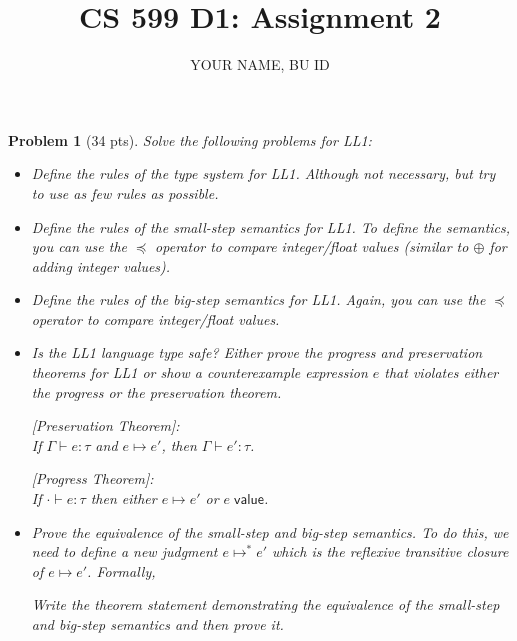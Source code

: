 \documentclass{article}
\title{CS 599 D1: Assignment 2}
\author{YOUR NAME, BU ID}
\date{}
\newcommand{\m}[1]{\mathsf{#1}}
\newcommand{\step}{\mapsto}
\newcommand{\val}[1]{#1 \; \m{value}}
\newcommand{\G}{\Gamma}
\newcommand{\mstep}{\step^{*}}
\newtheorem{problem}{Problem}
\begin{document}
\maketitle

\begin{problem}[34 pts]
Solve the following problems for LL1:

    \begin{itemize}
        \item[(4 pts)] Define the rules of the type system for LL1. Although not necessary, but try to use as
        few rules as possible.
        
        \item[(5 pts)] Define the rules of the small-step semantics for LL1. To define the semantics, you can use the $\preceq$
        operator to compare integer/float values (similar to $\oplus$ for adding integer values).

        \item[(5 pts)] Define the rules of the big-step semantics for LL1. Again, you can use the $\preceq$
        operator to compare integer/float values.
        
        \item[(10 pts)] Is the LL1 language type safe? Either prove the progress and preservation theorems for LL1
        or show a counterexample expression $e$ that violates either the progress or the preservation theorem.

        [Preservation Theorem]:\\
        If $\G \vdash e : \tau$ and $e \step e'$, then $\G \vdash e' : \tau$.

        [Progress Theorem]:\\
        If $\cdot \vdash e : \tau$ then either $e \step e'$ or $\val{e}$.

        \item[(10 pts)] Prove the equivalence of the small-step and big-step semantics. To do this, we need to define
        a new judgment $e \mstep e'$ which is the reflexive transitive closure of $e \step e'$. Formally,

        Write the theorem statement demonstrating the equivalence of the small-step and big-step semantics and then
        prove it.
        
    \end{itemize}
\end{problem}
\end{document}
